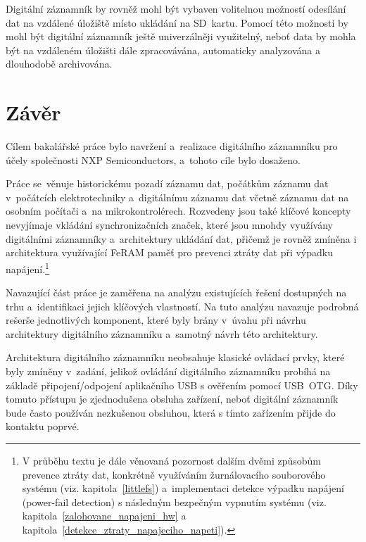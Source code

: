 Digitální záznamník by rovněž mohl být vybaven volitelnou možností odesílání dat na vzdálené úložiště místo ukládání na SD~kartu. Pomocí této možnosti by mohl být digitální záznamník ještě univerzálněji využitelný, neboť data by mohla být na vzdáleném úložišti dále zpracovávána, automaticky analyzována a dlouhodobě archivována.



\chapter{Závěr}
\label{zaver}
Cílem bakalářské práce bylo navržení a~realizace digitálního záznamníku pro účely společnosti NXP Semiconductors, a~tohoto cíle bylo dosaženo.

Práce se~věnuje historickému pozadí záznamu dat, počátkům záznamu dat v~počátcích elektrotechniky a~digitálnímu záznamu dat včetně záznamu dat na osobním počítači a~na mikrokontrolérech. Rozvedeny jsou také klíčové koncepty nevyjímaje vkládání synchronizačních značek, které jsou mnohdy využívány digitálními záznamníky a~architektury ukládání dat, přičemž je rovněž zmíněna i architektura využívající FeRAM paměť pro prevenci ztráty dat při výpadku napájení.\footnote{V průběhu textu je dále věnovaná pozornost dalším dvěmi způsobům prevence ztráty dat, konkrétně využíváním žurnálovacího souborového systému (viz. kapitola~\ref{littlefs}) a~implementaci detekce výpadku napájení (power-fail detection) s následným bezpečným vypnutím systému (viz. kapitola~\ref{zalohovane_napajeni_hw} a kapitola~\ref{detekce_ztraty_napajeciho_napeti}).}

Navazující část práce je zaměřena na analýzu existujících řešení dostupných na trhu a~identifikaci jejich klíčových vlastností. Na tuto analýzu navazuje podrobná rešerše jednotlivých komponent, které byly brány v~úvahu při návrhu architektury digitálního záznamníku a~samotný návrh této architektury.

Architektura digitálního záznamníku neobsahuje klasické ovládací prvky, které byly zmíněny v~zadání, jelikož ovládání digitálního záznamníku probíhá na základě připojení/odpojení aplikačního USB s ověřením pomocí USB~OTG. Díky tomuto přístupu je zjednodušena obsluha zařízení, neboť digitální záznamník bude často používán nezkušenou obsluhou, která s tímto zařízením přijde do kontaktu poprvé.

